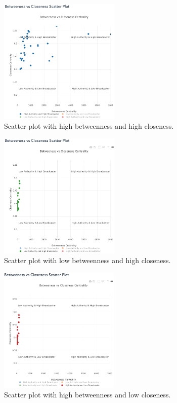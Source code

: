 \documentclass[conference]{IEEEtran}
\begin{document}
\begin{figure}[h!]
  \includegraphics[width=\linewidth, height=6cm]{scatterplot_blue.png}
  \caption{Scatter plot with high betweenness and high closeness.}
  \label{fig:scatterplot_hbhc}
\end{figure}

\begin{figure}[h!]
  \includegraphics[width=\linewidth, height=6cm]{scatterplot_green.png}
  \caption{Scatter plot with low betweenness and high closeness.}
  \label{fig:scatterplot_lbhc}
\end{figure}

\begin{figure}[h!]
  \includegraphics[width=\linewidth, height=6cm]{scatterplot_red.png}
  \caption{Scatter plot with high betweenness and low closeness.}
  \label{fig:scatterplot_hblc}
\end{figure}
\end{document}
